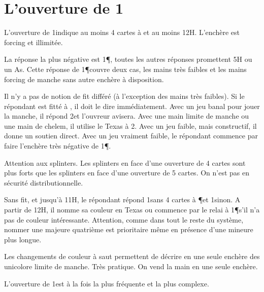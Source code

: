\chapter{L'ouverture de 1\T}

\begin{multicols}{2}


L'ouverture de 1\T indique au moins 4 cartes à \C et au moins 12H. L'enchère est forcing et illimitée.

La réponse la plus négative est 1\P, toutes les autres réponses promettent 5H ou un As. Cette réponse de 1\P couvre deux cas, les mains très faibles et les mains forcing de manche sans autre enchère à disposition.

Il n'y a pas de notion de fit différé (à l'exception des mains très faibles). Si le répondant est fitté à \C, il doit le dire immédiatement. Avec un jeu banal pour jouer la manche, il répond 2\NT et l'ouvreur avisera. Avec une main limite de manche ou une main de chelem, il utilise le Texas à 2\K. Avec un jeu faible, mais constructif, il donne un soutien direct. Avec un jeu vraiment faible, le répondant commence par faire l'enchère très négative de 1\P.

Attention aux splinters. Les splinters en face d'une ouverture de 4 cartes sont plus forts que les splinters en face d'une ouverture de 5 cartes. On n'est pas en sécurité distributionnelle.

Sans fit, et jusqu'à 11H, le répondant répond 1\K sans 4 cartes à \P et 1\C sinon. A partir de 12H, il nomme sa couleur en Texas ou commence par le relai à 1\P s'il n'a pas de couleur intéressante. Attention, comme dans tout le reste du système, nommer une majeure quatrième est prioritaire même en présence d'une mineure plus longue.

Les changements de couleur à saut permettent de décrire en une seule enchère des unicolore limite de manche. Très pratique. On vend la main en une seule enchère.

L'ouverture de 1\T est à la fois la plus fréquente et la plus complexe.
\end{multicols}



